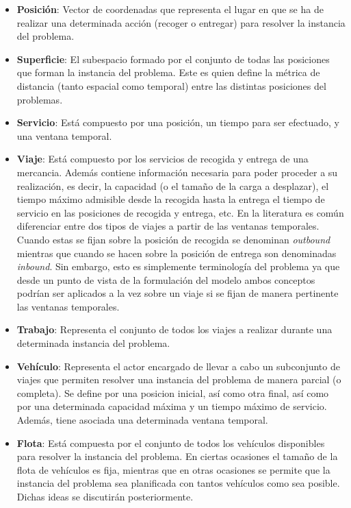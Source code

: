 \documentclass{subfiles}
\begin{document}
        \begin{itemize}

          \item \textbf{Posición}: Vector de coordenadas que representa el lugar en que se ha de realizar una determinada acción (recoger o entregar) para resolver la instancia del problema.

          \item \textbf{Superficie}: El subespacio formado por el conjunto de todas las posiciones que forman la instancia del problema. Este es quien define la métrica de distancia (tanto espacial como temporal) entre las distintas posiciones del problemas.

          \item \textbf{Servicio}: Está compuesto por una posición, un tiempo para ser efectuado, y una ventana temporal.

          \item \textbf{Viaje}: Está compuesto por los servicios de recogida y entrega de una mercancia. Además contiene información necesaria para poder proceder a su realización, es decir, la capacidad (o el tamaño de la carga a desplazar), el tiempo máximo admisible desde la recogida hasta la entrega el tiempo de servicio en las posiciones de recogida y entrega, etc. En la literatura es común diferenciar entre dos tipos de viajes a partir de las ventanas temporales. Cuando estas se fijan sobre la posición de recogida se denominan \emph{outbound} mientras que cuando se hacen sobre la posición de entrega son denominadas \emph{inbound}. Sin embargo, esto es simplemente terminología del problema ya que desde un punto de vista de la formulación del modelo ambos conceptos podrían ser aplicados a la vez sobre un viaje si se fijan de manera pertinente las ventanas temporales.

          \item \textbf{Trabajo}: Representa el conjunto de todos los viajes a realizar durante una determinada instancia del problema.

          \item \textbf{Vehículo}: Representa el actor encargado de llevar a cabo un subconjunto de viajes que permiten resolver una instancia del problema de manera parcial (o completa). Se define por una posicion inicial, así como otra final, así como por una determinada capacidad máxima y un tiempo máximo de servicio. Además, tiene asociada una determinada ventana temporal.

          \item \textbf{Flota}: Está compuesta por el conjunto de todos los vehículos disponibles para resolver la instancia del problema. En ciertas ocasiones el tamaño de la flota de vehículos es fija, mientras que en otras ocasiones se permite que la instancia del problema sea planificada con tantos vehículos como sea posible. Dichas ideas se discutirán posteriormente.


\end{itemize}
\end{document}
